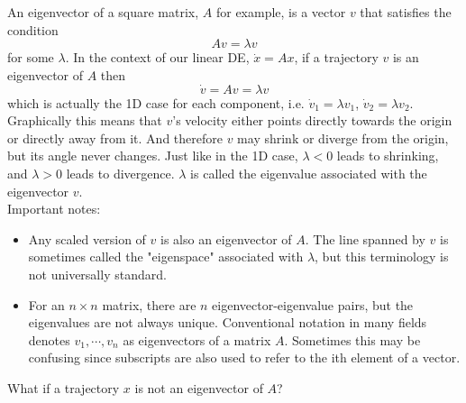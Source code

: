 \documentclass[11pt, oneside]{article}   	%
\begin{document}
An eigenvector of a square matrix, $A$ for example, is a vector $v$ that satisfies the condition
\begin{equation}
Av = \lambda v
\end{equation}
for some $\lambda$.
In the context of our linear DE, $\dot{x} = Ax$, if a trajectory $v$ is an eigenvector of $A$ then
$$ \dot{v} = Av = \lambda v $$
which is actually the 1D case for each component,
i.e. $\dot{v}_1 = \lambda v_1$, $\dot{v}_2 = \lambda v_2$.
Graphically this means that $v$'s velocity either points directly towards the origin or directly away from it.
And therefore $v$ may shrink or diverge from the origin, but its angle never changes.
Just like in the 1D case, $\lambda < 0$ leads to shrinking, and $\lambda > 0$ leads to divergence.
$\lambda$ is called the eigenvalue associated with the eigenvector $v$. \\

\noindent
Important notes:
\begin{itemize}
\item Any scaled version of $v$ is also an eigenvector of $A$.
The line spanned by $v$ is sometimes called the "eigenspace" associated with $\lambda$, but this terminology is not universally standard.
\item For an $n\times n$ matrix, there are $n$ eigenvector-eigenvalue pairs, but the eigenvalues are not always unique.
Conventional notation in many fields denotes $ v_1,\cdots,v_n $ as eigenvectors of a matrix $A$.
Sometimes this may be confusing since subscripts are also used to refer to the ith element of a vector.
\end{itemize}

What if a trajectory $x$ is not an eigenvector of $A$?
\end{document}

